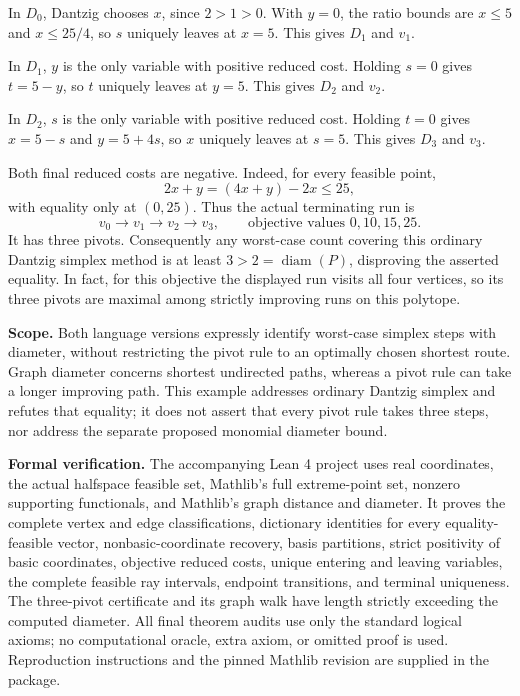 \documentclass[11pt]{article}
\begin{document}
In $D_0$, Dantzig chooses $x$, since $2>1>0$. With $y=0$, the ratio bounds are $x\le5$ and $x\le25/4$, so $s$ uniquely leaves at $x=5$. This gives $D_1$ and $v_1$.

In $D_1$, $y$ is the only variable with positive reduced cost. Holding $s=0$ gives $t=5-y$, so $t$ uniquely leaves at $y=5$. This gives $D_2$ and $v_2$.

In $D_2$, $s$ is the only variable with positive reduced cost. Holding $t=0$ gives $x=5-s$ and $y=5+4s$, so $x$ uniquely leaves at $s=5$. This gives $D_3$ and $v_3$.

Both final reduced costs are negative. Indeed, for every feasible point,
\[
 2x+y=(4x+y)-2x\le25,
\]
with equality only at $(0,25)$. Thus the actual terminating run is
\[
 v_0\longrightarrow v_1\longrightarrow v_2\longrightarrow v_3,
 \qquad\text{objective values }0,10,15,25.
\]
It has three pivots. Consequently any worst-case count covering this ordinary Dantzig simplex method is at least $3>2=\operatorname{diam}(P)$, disproving the asserted equality. In fact, for this objective the displayed run visits all four vertices, so its three pivots are maximal among strictly improving runs on this polytope.

\textbf{Scope.} Both language versions expressly identify worst-case simplex steps with diameter, without restricting the pivot rule to an optimally chosen shortest route. Graph diameter concerns shortest undirected paths, whereas a pivot rule can take a longer improving path. This example addresses ordinary Dantzig simplex and refutes that equality; it does not assert that every pivot rule takes three steps, nor address the separate proposed monomial diameter bound.

\textbf{Formal verification.} The accompanying Lean 4 project uses real coordinates, the actual halfspace feasible set, Mathlib's full extreme-point set, nonzero supporting functionals, and Mathlib's graph distance and diameter. It proves the complete vertex and edge classifications, dictionary identities for every equality-feasible vector, nonbasic-coordinate recovery, basis partitions, strict positivity of basic coordinates, objective reduced costs, unique entering and leaving variables, the complete feasible ray intervals, endpoint transitions, and terminal uniqueness. The three-pivot certificate and its graph walk have length strictly exceeding the computed diameter. All final theorem audits use only the standard logical axioms; no computational oracle, extra axiom, or omitted proof is used. Reproduction instructions and the pinned Mathlib revision are supplied in the package.
\end{document}
